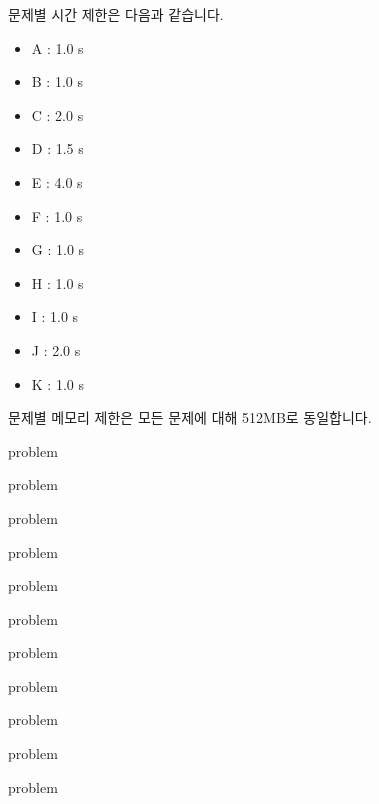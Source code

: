 \documentclass[11pt,a4paper,oneside,final]{article}
\begin{document}
\newpage
문제별 시간 제한은 다음과 같습니다.

\begin{itemize}
\item A : 1.0 s
\item B : 1.0 s
\item C : 2.0 s
\item D : 1.5 s
\item E : 4.0 s
\item F : 1.0 s
\item G : 1.0 s
\item H : 1.0 s
\item I : 1.0 s
\item J : 2.0 s
\item K : 1.0 s
\end{itemize}

문제별 메모리 제한은 모든 문제에 대해 512MB로 동일합니다.

\newpage

{problem}

{problem}

{problem}

{problem}

{problem}

{problem}

{problem}

{problem}

{problem}

{problem}

{problem}
\end{document}
